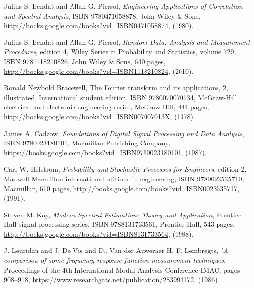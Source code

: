 \begin{thebibliography}{99}

         Julius S. Bendat and Allan G. Piersol, 
         \emph{Engineering Applications of Correlation and Spectral Analysis}, 
         ISBN 9780471058878, John Wiley \& Sons,
         \url{http://books.google.com/books?vid=ISBN0471058874},
         (1980).

         Julius S. Bendat and Allan G. Piersol, 
         \emph{Random Data: Analysis and Measurement Procedures}, edition 4,
         {Wiley Series in Probability and Statistics}, volume 729,
         ISBN 9781118210826, John Wiley \& Sons, 640 pages,
         \url{http://books.google.com/books?vid=ISBN1118210824},
         (2010).

        {Ronald Newbold Bracewell},
        {The Fourier transform and its applications},
        {2, illustrated, International student edition},
        {ISBN 9780070070134},
        {McGraw-Hill electrical and electronic engineering series},
        {McGraw-Hill},
        {444 pages},
        {http://books.google.com/books?vid=ISBN007007013X},
        (1978).

         {James A. Cadzow},
         \emph{Foundations of Digital Signal Processing and Data Analysis},
         ISBN {9780023180101}, {Macmillan Publishing Company},
         \url{https://books.google.com/books?vid=ISBN9780023180101},
         (1987).

         Carl W. Helstrom,
         \emph{Probability and Stochastic Processes for Engineers},
         edition 2,
         {Maxwell Macmillan international editions in engineering},
         ISBN 9780023535710, Macmillan, 610 pages,
         \url{http://books.google.com/books?vid=ISBN0023535717},
         (1991).

         \newblock Steven M. Kay,
         \newblock \emph{Modern Spectral Estimation: Theory and Application},
         \newblock Prentice-Hall signal processing series,
         \newblock ISBN 9788131733561, Prentice Hall, 543 pages,
         \newblock \url{http://books.google.com/books?vid=ISBN8131733564},
         \newblock (1988).

        {J. Leuridan and J. De Vis and D., Van der Auweraer H. F. Lembregts},
         \emph{"A comparison of some frequency response function measurement techniques},
         {Proceedings of the 4th International Modal Analysis Conference IMAC},
         pages 908--918,
         \url{https://www.researchgate.net/publication/283994172},
         (1986).


\end{thebibliography}
